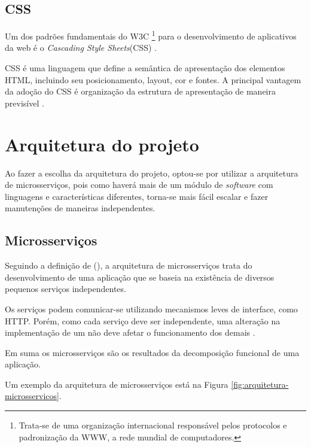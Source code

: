 
\subsection{CSS}
Um dos padrões fundamentais do W3C \footnote{Trata-se de uma organização internacional responsável pelos protocolos e padronização da WWW, a rede mundial de computadores.} para o desenvolvimento de aplicativos da web é o \textit{Cascading Style Sheets}(CSS) \cite{Casca8378199:online,css}.

CSS é uma linguagem que define a semântica de apresentação dos elementos HTML, incluindo seu posicionamento, layout, cor e fontes. A principal vantagem da adoção do CSS é organização da estrutura de apresentação de maneira previsível \cite{badros1999constraint}.



\section{Arquitetura do projeto}

Ao fazer a escolha da arquitetura do projeto, optou-se por utilizar a arquitetura de microsserviços, pois como haverá mais de um módulo de \textit{software} com linguagens e características diferentes, torna-se mais fácil escalar e fazer manutenções de maneiras independentes.

\subsection{Microsserviços}
Seguindo a definição de \citeauthor{ms1} (\citeyear{ms1}), a arquitetura de microsserviços trata do desenvolvimento de uma aplicação que se baseia na existência de diversos pequenos serviços independentes. 

Os serviços podem comunicar-se utilizando mecanismos leves de interface, como HTTP. Porém, como cada serviço deve ser independente, uma alteração na implementação de um não deve afetar o funcionamento dos demais \cite{Pahl}.

Em suma os microsserviços são os resultados da decomposição funcional de uma aplicação. 

Um exemplo da arquitetura de microsserviços está na Figura \ref{fig:arquitetura-microsservicos}.

